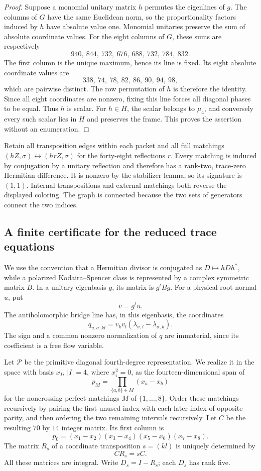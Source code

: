 \documentclass[11pt]{article}
\theoremstyle{definition}
\theoremstyle{remark}
\begin{document}
\begin{proof}
Suppose a monomial unitary matrix \(h\) permutes the eigenlines of
\(g\).  The columns of \(G\) have the same Euclidean norm, so the
proportionality factors induced by \(h\) have absolute value one.
Monomial unitaries preserve the sum of absolute coordinate values.
For the eight columns of \(G\), these sums are respectively
\[
 940,\ 844,\ 732,\ 676,\ 688,\ 732,\ 784,\ 832.
\]
The first column is the unique maximum, hence its line is fixed.
Its eight absolute coordinate values are
\[
 338,\ 74,\ 78,\ 82,\ 86,\ 90,\ 94,\ 98,
\]
which are pairwise distinct.  The row permutation of \(h\) is
therefore the identity.  Since all eight coordinates are nonzero,
fixing this line forces all diagonal phases to be equal.  Thus
\(h\) is scalar.  For \(h\in H\), the scalar belongs to \(\mu_4\),
and conversely every such scalar lies in \(H\) and preserves the
frame.  This proves the assertion without an enumeration.
\end{proof}

Retain all transposition edges within each packet and all full
matchings \((hZ,\sigma)\leftrightarrow(hrZ,\sigma)\) for the
forty-eight reflections \(r\).  Every matching is induced by
conjugation by a unitary reflection and therefore has a rank-two,
trace-zero Hermitian difference.  It is nonzero by the stabilizer
lemma, so its signature is \((1,1)\).  Internal transpositions and
external matchings both reverse the displayed coloring.  The graph
is connected because the two sets of generators connect the two
indices.

\subsection{A finite certificate for the reduced trace equations}
\label{subsec:gaussian-trace-certificate}

We use the convention that a Hermitian divisor is conjugated as
\(D\mapsto hDh^*\), while a polarized Kodaira--Spencer class is represented
by a complex symmetric matrix \(B\).  In a unitary eigenbasis \(g\), its
matrix is \(g^tBg\).  For a physical root normal \(u\), put
\[
 v=g^t\overline u.
\]
The antiholomorphic bridge line has, in this eigenbasis, the coordinates
\[
 q_{u,\sigma;kl}
   =v_kv_l(\lambda_{\sigma,l}-\lambda_{\sigma,k}).
\]
The sign and a common nonzero normalization of \(q\) are immaterial,
since its coefficient is a free flow variable.

Let \(\mathcal P\) be the primitive diagonal fourth-degree representation.
We realize it in the space with basis \(x_I\), \(|I|=4\), where
\(x_i^2=0\), as the fourteen-dimensional span of
\[
 p_M=\prod_{\{a,b\}\in M}(x_a-x_b)
\]
for the noncrossing perfect matchings \(M\) of
\(\{1,\ldots,8\}\).  Order these matchings recursively by pairing the
first unused index with each later index of opposite parity, and then
ordering the two remaining intervals recursively.  Let \(C\) be the
resulting \(70\) by \(14\) integer matrix.  Its first column is
\[
 p_0=(x_1-x_2)(x_3-x_4)(x_5-x_6)(x_7-x_8).
\]
The matrix \(R_s\) of a coordinate transposition \(s=(kl)\) is uniquely
determined by
\[
 CR_s=sC.
\]
All these matrices are integral.  Write \(D_s=I-R_s\); each \(D_s\)
has rank five.
\end{document}
